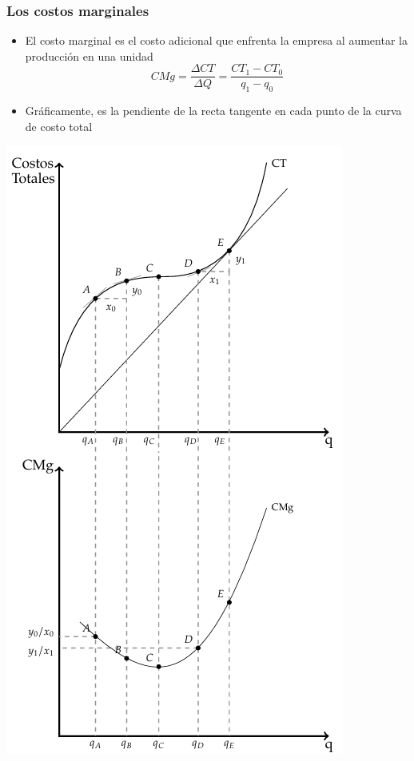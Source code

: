\documentclass{beamer}
\begin{document}
    
\begin{frame}
\frametitle{Los costos marginales}
    \begin{minipage}{0.5\textwidth}
    \begin{itemize}
    \item El costo marginal es el costo adicional que enfrenta la empresa al aumentar la producción en una unidad 
        \[ CMg = \frac{\Delta CT}{\Delta Q} = \frac{CT_1 - CT_0}{q_1 - q_0} \]
    \item Gráficamente, es la pendiente de la recta tangente en cada punto de la curva de costo total
    \end{itemize}
    \end{minipage}
    \hfill
    \begin{minipage}{0.4\textwidth}
    \includegraphics[scale=0.31]{../Figures/C13.7.png}
    \end{minipage}
\end{frame}
\end{document}
